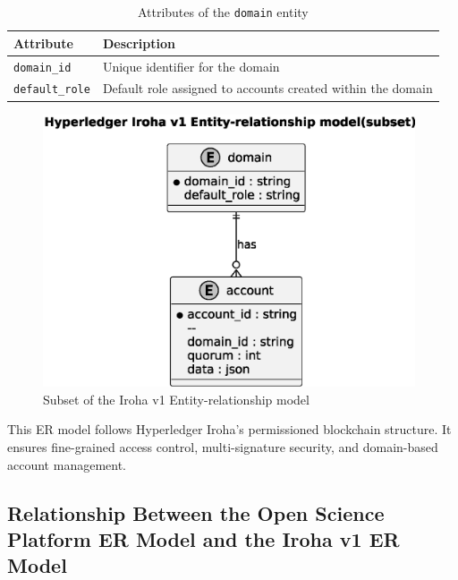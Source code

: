 \documentclass[final]{rc-book-2.14}
\begin{document}
\begin{table}[h]
    \centering
    \renewcommand{\arraystretch}{1.2}
    \caption{Attributes of the \texttt{domain} entity}
    \label{tab:domain_entity}
    \begin{tabularx}{\textwidth}{|l|X|}
        \hline
        \textbf{Attribute}     & \textbf{Description}                                        \\ \hline
        \texttt{domain\_id}    & Unique identifier for the domain                            \\ \hline
        \texttt{default\_role} & Default role assigned to accounts created within the domain \\ \hline
    \end{tabularx}
\end{table}



\begin{figure}[htbp]
    \centering
    \includegraphics[width=0.98\textwidth, keepaspectratio]{fig/iroha_v1_er_model.eps}
    \caption{Subset of the Iroha v1 Entity-relationship model}
    \label{fig:iroha_v1_er_model}
\end{figure}


This ER model follows Hyperledger Iroha’s permissioned blockchain structure. It ensures fine-grained access control, multi-signature security, and domain-based account management.


\subsection{Relationship Between the Open Science Platform ER Model and the Iroha v1 ER Model}
\end{document}
